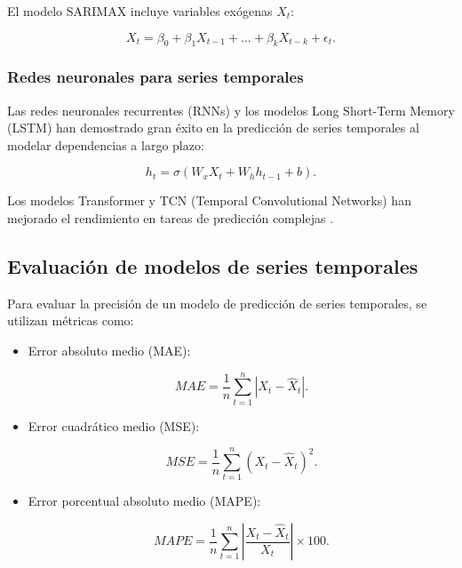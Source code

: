 \begin{itemize}
		El modelo SARIMAX incluye variables exógenas \( X_t \):
		
		\begin{equation}
			X_t = \beta_0 + \beta_1 X_{t-1} + \dots + \beta_k X_{t-k} + \epsilon_t.
		\end{equation}
		
		\subsubsection{Redes neuronales para series temporales}
		
		Las redes neuronales recurrentes (RNNs) y los modelos Long Short-Term Memory (LSTM) han demostrado gran éxito en la predicción de series temporales al modelar dependencias a largo plazo:
		
		\begin{equation}
			h_t = \sigma(W_x X_t + W_h h_{t-1} + b).
		\end{equation}
		
		Los modelos Transformer y TCN (Temporal Convolutional Networks) han mejorado el rendimiento en tareas de predicción complejas \cite{hochreiter1997long}.
		
		\subsection{Evaluación de modelos de series temporales}
		
		Para evaluar la precisión de un modelo de predicción de series temporales, se utilizan métricas como:
		
		\begin{itemize}
			\item Error absoluto medio (MAE):
			
			\begin{equation}
				MAE = \frac{1}{n} \sum_{t=1}^{n} |X_t - \hat{X}_t|.
			\end{equation}
			
			\item Error cuadrático medio (MSE):
			
			\begin{equation}
				MSE = \frac{1}{n} \sum_{t=1}^{n} (X_t - \hat{X}_t)^2.
			\end{equation}
			
			\item Error porcentual absoluto medio (MAPE):
			
			\begin{equation}
				MAPE = \frac{1}{n} \sum_{t=1}^{n} \left| \frac{X_t - \hat{X}_t}{X_t} \right| \times 100.
			\end{equation}
		\end{itemize}
		

\end{itemize}
